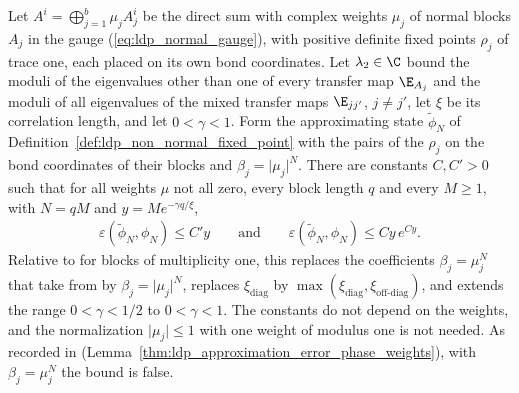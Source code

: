 \begin{lemma}
    \label{thm:ldp_approximation_error_complex_weights}
    \leanok
    Let $A^i=\bigoplus_{j=1}^b\mu_jA_j^i$ be the direct sum with complex weights $\mu_j$
    of normal blocks $A_j$ in the gauge (\ref{eq:ldp_normal_gauge}), with positive
    definite fixed points $\rho_j$ of trace one, each placed on its own bond coordinates.
    Let $\lambda_2\in\C$ bound the moduli of the eigenvalues other than one of every
    transfer map $\E_{A_j}$ and the moduli of all eigenvalues of the mixed transfer maps
    $\E_{jj'}$, $j\neq j'$, let $\xi$ be its correlation length, and let $0<\gamma<1$.
    Form the approximating state $\widetilde\phi_N$ of
    Definition~\ref{def:ldp_non_normal_fixed_point} with the pairs of the $\rho_j$ on the
    bond coordinates of their blocks and $\beta_j=\lvert\mu_j\rvert^N$. There are
    constants $C,C'>0$ such that for all weights $\mu$ not all zero, every block length
    $q$ and every $M\geq1$, with $N=qM$ and $y=Me^{-\gamma q/\xi}$,
    \begin{align*}
        \varepsilon(\widetilde\phi_N,\phi_N)\leq C'y
        \qquad\text{and}\qquad
        \varepsilon(\widetilde\phi_N,\phi_N)\leq Cy\,e^{Cy}.
    \end{align*}
    Relative to \cite[Lemma~1$'$(ii)]{Malz2024Preparation} for blocks of multiplicity one,
    this replaces the coefficients $\beta_j=\mu_j^N$ that
    \cite[eqs.~(S6) and (S7)]{Malz2024Preparation} take from
    \cite[eq.~(S4)]{Malz2024Preparation} by $\beta_j=\lvert\mu_j\rvert^N$, replaces
    $\xi_{\mathrm{diag}}$ by
    $\max(\xi_{\mathrm{diag}},\xi_{\mathrm{off\text{-}diag}})$, and extends the range
    $0<\gamma<1/2$ to $0<\gamma<1$. The constants do not depend on the weights, and the
    normalization $\lvert\mu_j\rvert\leq1$ with one weight of modulus one is not needed.
    As recorded in \cite{gap:mswc24_block_form_mixed_overlap}
    (Lemma~\ref{thm:ldp_approximation_error_phase_weights}), with $\beta_j=\mu_j^N$
    the bound is false.
\end{lemma}


